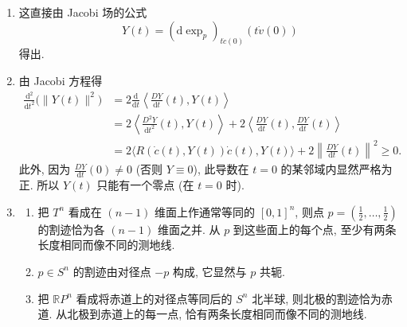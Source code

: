 \begin{description}[font=\normalfont,leftmargin=2em,labelwidth=1.5em]
\begin{enumerate}[label=(\alph*),ref=\alph*,leftmargin=*]
反过来, 给定满足 $Y(0)=0$ 的沿 $c$ 的 Jacobi 方程的解 $Y(t)$, 选取
\[
  \widetilde Y(t)=\left.\frac{\partial}{\partial s}\exp_p(t(v_0+sw_0))\right|_{s=0},
\]
其中 $v_0=\dot c(0)$, $w_0=\frac{DY}{\mathrm{d}t}(0)$. 则 $\widetilde Y(0)=0$. 此外, 利用正规坐标的 Christoffel 符号在原点处为零, 容易看出
\[
  \frac{D\widetilde Y}{\mathrm{d}t}(0)=w_0=\frac{DY}{\mathrm{d}t}(0).
\]
如上所见, $\widetilde Y(t)$ 也是沿 $t$ 的 Jacobi 方程的一个解, 由 Picard–Lindelöf 定理, 对所有 $t\in\mathbb{R}$, 有 $\widetilde Y(t)=Y(t)$.
\item 这直接由 Jacobi 场的公式
\[
  Y(t)=(\mathrm{d}\exp_p)_{t\dot c(0)}(t\dot v(0))
\]
得出.
\item 由 Jacobi 方程得
\begin{align*}
  \frac{\mathrm{d}^2}{\mathrm{d}t^2}\bigl(\lVert Y(t)\rVert^2\bigr)
  &=2\frac{\mathrm{d}}{\mathrm{d}t}\left\langle\frac{DY}{\mathrm{d}t}(t),Y(t)\right\rangle\\
  &=2\left\langle\frac{D^2Y}{\mathrm{d}t^2}(t),Y(t)\right\rangle
      +2\left\langle\frac{DY}{\mathrm{d}t}(t),\frac{DY}{\mathrm{d}t}(t)\right\rangle\\
  &=2\langle R(\dot c(t),Y(t))\dot c(t),Y(t)\rangle
      +2\left\lVert\frac{DY}{\mathrm{d}t}(t)\right\rVert^2\ge0.
\end{align*}
此外, 因为 $\frac{DY}{\mathrm{d}t}(0)\ne0$ (否则 $Y\equiv0$), 此导数在 $t=0$ 的某邻域内显然严格为正. 所以 $Y(t)$ 只能有一个零点 (在 $t=0$ 时).
\item
\begin{enumerate}[label=(\roman*),ref=\roman*,leftmargin=*]
\item 把 $T^n$ 看成在 $(n-1)$ 维面上作通常等同的 $[0,1]^n$, 则点 $p=(\frac12,\ldots,\frac12)$ 的割迹恰为各 $(n-1)$ 维面之并. 从 $p$ 到这些面上的每个点, 至少有两条长度相同而像不同的测地线.
\item $p\in S^n$ 的割迹由对径点 $-p$ 构成, 它显然与 $p$ 共轭.
\item 把 $\mathbb{R}P^n$ 看成将赤道上的对径点等同后的 $S^n$ 北半球, 则北极的割迹恰为赤道. 从北极到赤道上的每一点, 恰有两条长度相同而像不同的测地线.
\end{enumerate}
\end{enumerate}
\end{description}
